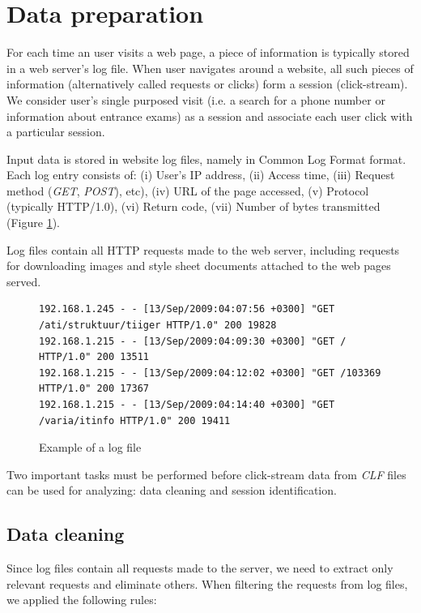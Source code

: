 \documentclass[12pt, english,a4paper]{article}
\begin{document}
\section{Data preparation} 
For each time an user visits a web page, a piece of information is typically stored in a web server's log file. When user navigates around a website, all such pieces of information (alternatively called requests or clicks) form a session (click-stream). We consider user's single purposed visit  (i.e. a search for a phone number or information about entrance exams) as a session and associate each user click with a particular session. 

Input data is stored in website log files, namely in Common Log Format\cite{ref_clf} format. Each log entry consists of:  (i) User's IP address, (ii) Access time, (iii) Request method (\emph{GET}, \emph{POST}), etc), (iv) URL of the page accessed, (v) Protocol (typically HTTP/1.0), (vi) Return code, (vii) Number of bytes transmitted (Figure \ref{log_sample}).

Log files contain all HTTP requests made to the web server, including requests for downloading images and style sheet documents attached to the web pages served.

\begin{figure}[h]
{\tiny
\begin{verbatim}
192.168.1.245 - - [13/Sep/2009:04:07:56 +0300] "GET /ati/struktuur/tiiger HTTP/1.0" 200 19828
192.168.1.215 - - [13/Sep/2009:04:09:30 +0300] "GET / HTTP/1.0" 200 13511
192.168.1.215 - - [13/Sep/2009:04:12:02 +0300] "GET /103369 HTTP/1.0" 200 17367
192.168.1.215 - - [13/Sep/2009:04:14:40 +0300] "GET /varia/itinfo HTTP/1.0" 200 19411
\end{verbatim}
}
\label{log_sample}
\caption{Example of a log file}
\end{figure}

Two important tasks must be performed before click-stream data from \emph{CLF} files can be used for analyzing: data cleaning and session identification.







\subsection{Data cleaning}
Since log files contain all requests made to the server, we need to extract only relevant requests and eliminate others. When filtering the requests from log files, we applied the following rules:
\end{document}
